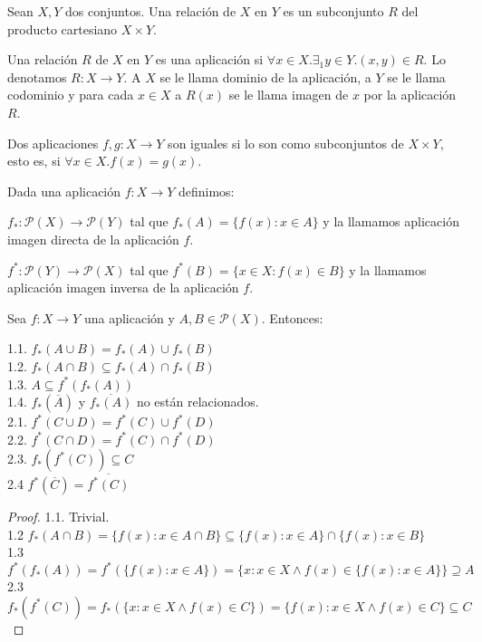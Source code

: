\begin{definition}
	Sean $X,Y$ dos conjuntos. Una relación de $X$ en $Y$ es un subconjunto $R$ del producto cartesiano $X \times Y$. 
	
	Una relación $R$ de $X$ en $Y$ es una aplicación si $\forall x \in X.  \exists_1 y \in Y. (x,y) \in R$. Lo denotamos $R:X \to Y$. A $X$ se le llama dominio de la aplicación, a $Y$ se le llama codominio y para cada $x \in X$ a $R(x)$ se le llama imagen de $x$ por la aplicación $R$. 
\end{definition}

Dos aplicaciones $f,g:X \to Y$ son iguales si lo son como subconjuntos de $X  \times Y$, esto es, si $\forall x \in X. f(x) = g(x)$. 

\begin{definition}
	Dada una aplicación $f:X \to Y$ definimos:
	
	 $f_{*}: \mathcal{P}(X) \to \mathcal{P}(Y)$ tal que $f_*(A) = \{f(x):x \in A\}$ y la llamamos aplicación imagen directa de la aplicación $f$. 	
	
	$f^{*}:\mathcal{P}(Y) \to \mathcal{P}(X)$ tal que $f^{*}(B) = \{x \in X:f(x) \in B \}$ y la llamamos aplicación imagen inversa de la aplicación $f$. 
\end{definition}

\begin{lemma}
	Sea $f:X \to Y$ una aplicación y $A,B \in \mathcal{P}(X)$. Entonces:
	
	1.1. $f_*(A \cup B) = f_*(A) \cup f_*(B)$\\
	1.2. $f_*(A \cap B) \subseteq f_*(A) \cap f_*(B)$\\
	1.3. $A \subseteq f^*(f_*(A))$ \\
	1.4. $f_*(\overline{A})$ y $\overline{f_*(A)}$ no están relacionados. \\
	2.1. $f^*(C \cup D) = f^*(C) \cup f^*(D)$ \\
	2.2. $f^*(C \cap D) = f^*(C) \cap f^*(D)$ \\
	2.3. $f_*(f^*(C)) \subseteq C$\\
	2.4 $f^*(\overline{C}) = \overline{f^*(C)}$
\end{lemma}
\begin{proof}
	1.1. Trivial.\\
	1.2 $f_*(A \cap B) = \{f(x):x \in A \cap B \} \subseteq \{f(x):x \in A \} \cap \{f(x):x \in B \}$ \\
	1.3 $f^*(f_*(A)) = f^*(\{f(x):x \in A\}) = \{x:x \in X \land f(x) \in \{f(x):x \in A\} \} \supseteq A$\\
	2.3 $f_*(f^*(C)) = f_*(\{x:x \in X \land f(x) \in C \}) = \{f(x):x \in X \land f(x) \in C \} \subseteq C $
\end{proof}

